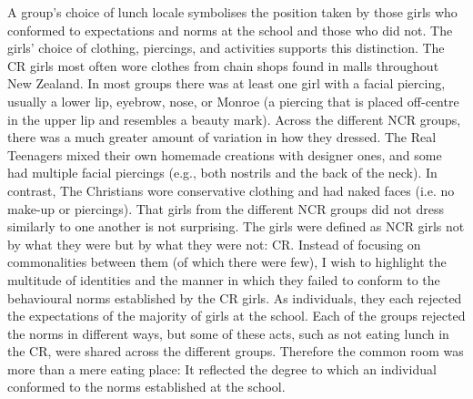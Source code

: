 A group's choice of lunch locale symbolises the position taken by those girls who conformed to expectations and norms at the school and those who did not. The girls' choice of clothing, piercings, and activities supports this distinction. The CR girls most often wore clothes from chain shops found in malls throughout New Zealand. In most groups there was at least one girl with a facial piercing, usually a lower lip, eyebrow, nose, or Monroe (a piercing that is placed off-centre in the upper lip and resembles a beauty mark). Across the different NCR groups, there was a much greater amount of variation in how they dressed. The Real Teenagers mixed their own homemade creations with designer ones, and some had multiple facial piercings (e.g., both nostrils and the back of the neck). In contrast, The Christians wore conservative clothing and had naked faces (i.e. no make-up or piercings). That girls from the different NCR groups did not dress similarly to one another is not surprising. The girls were defined as NCR girls not by what they were but by what they were not: CR. Instead of focusing on commonalities between them (of which there were few), I wish to highlight the multitude of identities and the manner in which they failed to conform to the behavioural norms established by the CR girls. As individuals, they each rejected the expectations of the majority of girls at the school. Each of the groups rejected the norms in different ways, but some of these acts, such as not eating lunch in the CR, were shared across the different groups. Therefore the common room was more than a mere eating place: It reflected the degree to which an individual conformed to the norms established at the school.




